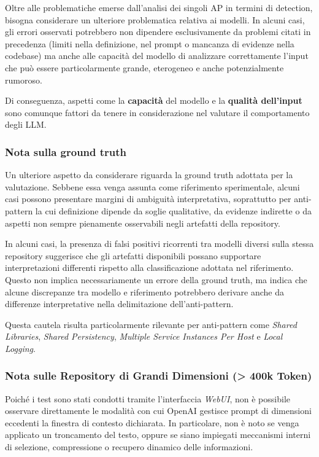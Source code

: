 Oltre alle problematiche emerse dall'analisi dei singoli AP in termini di detection, bisogna considerare un ulteriore problematica relativa ai modelli. In alcuni casi, gli errori osservati potrebbero non dipendere esclusivamente da problemi citati in precedenza (limiti nella definizione, nel prompt o mancanza di evidenze nella codebase) ma anche alle capacità del modello di analizzare correttamente l'input che può essere particolarmente grande, eterogeneo e anche potenzialmente rumoroso. 

Di conseguenza, aspetti come la \textbf{capacità} del modello e la \textbf{qualità dell'input} sono comunque fattori da tenere in considerazione nel valutare il comportamento degli LLM.

\subsubsection*{Nota sulla ground truth}

Un ulteriore aspetto da considerare riguarda la ground truth adottata per la valutazione. Sebbene essa venga assunta come riferimento sperimentale, alcuni casi possono presentare margini di ambiguità interpretativa, soprattutto per anti-pattern la cui definizione dipende da soglie qualitative, da evidenze indirette o da aspetti non sempre pienamente osservabili negli artefatti della repository.

In alcuni casi, la presenza di falsi positivi ricorrenti tra modelli diversi sulla stessa repository suggerisce che gli artefatti disponibili possano supportare interpretazioni differenti rispetto alla classificazione adottata nel riferimento. Questo non implica necessariamente un errore della ground truth, ma indica che alcune discrepanze tra modello e riferimento potrebbero derivare anche da differenze interpretative nella delimitazione dell'anti-pattern.

Questa cautela risulta particolarmente rilevante per anti-pattern come \textit{Shared Libraries}, \textit{Shared Persistency}, \textit{Multiple Service Instances Per Host} e \textit{Local Logging}. 


\vspace{1em}
\subsubsection*{Nota sulle Repository di Grandi Dimensioni (> 400k Token)}
Poiché i test sono stati condotti tramite l’interfaccia \textit{WebUI}, non è possibile osservare direttamente le modalità con cui OpenAI gestisce prompt di dimensioni eccedenti la finestra di contesto dichiarata. In particolare, non è noto se venga applicato un troncamento del testo, oppure se siano impiegati meccanismi interni di selezione, compressione o recupero dinamico delle informazioni.


